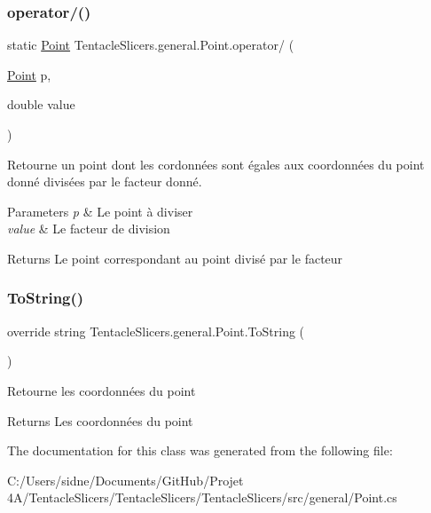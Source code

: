 \subsubsection{\texorpdfstring{operator/()}{operator/()}}
{\footnotesize\ttfamily static \hyperlink{class_tentacle_slicers_1_1general_1_1_point}{Point} Tentacle\+Slicers.\+general.\+Point.\+operator/ (\begin{DoxyParamCaption}\item[{\hyperlink{class_tentacle_slicers_1_1general_1_1_point}{Point}}]{p,  }\item[{double}]{value }\end{DoxyParamCaption})\hspace{0.3cm}{\ttfamily [static]}}



Retourne un point dont les cordonnées sont égales aux coordonnées du point donné divisées par le facteur donné. 


\begin{DoxyParams}{Parameters}
{\em p} & Le point à diviser \\
\hline
{\em value} & Le facteur de division \\
\hline
\end{DoxyParams}
\begin{DoxyReturn}{Returns}
Le point correspondant au point divisé par le facteur 
\end{DoxyReturn}
\mbox{\label{class_tentacle_slicers_1_1general_1_1_point_ae2810edb6f1fdc509f537bdb47617dbb}} 
\subsubsection{\texorpdfstring{To\+String()}{ToString()}}
{\footnotesize\ttfamily override string Tentacle\+Slicers.\+general.\+Point.\+To\+String (\begin{DoxyParamCaption}{ }\end{DoxyParamCaption})}



Retourne les coordonnées du point 

\begin{DoxyReturn}{Returns}
Les coordonnées du point 
\end{DoxyReturn}


The documentation for this class was generated from the following file\+:\begin{DoxyCompactItemize}
\item 
C\+:/\+Users/sidne/\+Documents/\+Git\+Hub/\+Projet 4\+A/\+Tentacle\+Slicers/\+Tentacle\+Slicers/\+Tentacle\+Slicers/src/general/Point.\+cs\end{DoxyCompactItemize}
